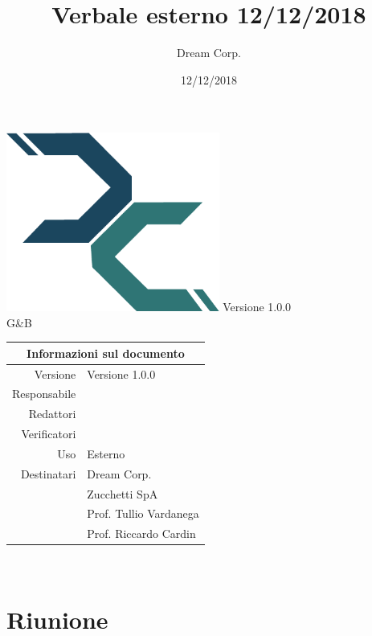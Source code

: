 \documentclass{article}
\title{\fontsize{40}{40}\selectfont Verbale esterno 12/12/2018}
\author{Dream Corp.}
\date{12/12/2018}
\newcommand{\red}{\daL}
\newcommand{\verp}{\mic}
\newcommand{\res}{\gia}
\newcommand{\version}{Versione 1.0.0}
\newcommand{\use}{Esterno}
\begin{document}
  
    \maketitle
	\begin{center}
	\hspace{5em}
	   \includegraphics[width =70mm]{../../logo.png}\newline
	\huge Versione 1.0.0 
	\\G\&B
	\begin{table}[!htpb]
		\centering
		\begin{tabular}{r|l}
			\multicolumn{2}{c}{Informazioni sul documento}\\
			\hline
			Versione & \version \\
			Responsabile & \res\\
			Redattori & \red \\
			Verificatori & \verp\\
			Uso & \use\\

			Destinatari & Dream Corp. \\
			& Zucchetti SpA\\
			& Prof. Tullio Vardanega\\
			& Prof. Riccardo Cardin\\
		\end{tabular}
	\end{table}
	\end{center}
  
  
  \newpage
\newline
~\newline
\section{Riunione}
\end{document}
